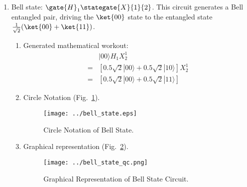 \documentclass[sigconf,natbib=false]{acmart}
\begin{document}
\begin{enumerate} %
\item Bell state: $\gate{H}_1\stategate{X}{1}{2}$. This circuit generates a Bell entangled pair, driving the $\ket{00}$ state to the entangled state $\frac{1}{\sqrt{2}}(\ket{00} + \ket{11})$.
\begin{enumerate}
\item Generated mathematical workout:
\begin{align*}
&|00\rangle H_{1}X_{2}^{1} \\
=& [0.5 \sqrt{2} |00\rangle +0.5 \sqrt{2} |10\rangle ]X_{2}^{1} \\
=& [0.5 \sqrt{2} |00\rangle +0.5 \sqrt{2} |11\rangle ]
\end{align*}
\item Circle Notation (Fig.~\ref{bell_state}).
\begin{figure}[!htb]
\centerline{\texttt{[image: ../bell\_state.eps]}}
\caption{Circle Notation of Bell State.}
\label{bell_state}
\end{figure}
\item Graphical representation (Fig.~\ref{bell_state_qc}).
\begin{figure}[!htb]
\centerline{\texttt{[image: ../bell\_state\_qc.png]}}
\caption{Graphical Representation of Bell State Circuit.}
\label{bell_state_qc}
\end{figure}
\end{enumerate}


\end{enumerate}
\end{document}
